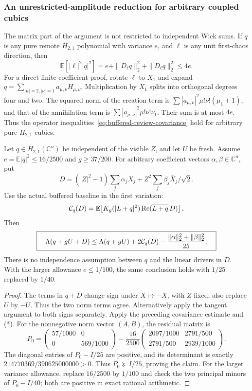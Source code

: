 \subsubsection{An unrestricted-amplitude reduction for arbitrary coupled cubics}
\label{sec:buffered-review-general}
The matrix part of the argument is not restricted to independent
Wick sums.  If \(q\) is any pure remote \(H_{2,1}\) polynomial
with variance \(e\), and \(\ell\) is any unit first-chaos direction,
then
\[
 \mathbb E[|\ell|^2|q|^2]
  =e+\|D_\ell q\|_2^2+\|\bar D_\ell q\|_2^2\le4e.
\]
For a direct finite-coefficient proof, rotate \(\ell\) to \(X_1\)
and expand \(q=\sum_{|\mu|=2,|\nu|=1}a_{\mu,\nu}H_{\mu,\nu}\).
Multiplication by \(X_1\) splits into orthogonal degrees four
and two. The squared norm of the creation term is
\(\sum |a_{\mu,\nu}|^2\mu!\nu!(\mu_1+1)\), and that of
the annihilation term is
\(\sum |a_{\mu,\nu}|^2\mu!\nu!\nu_1\).
Their sum is at most \(4e\). Thus
the operator inequalities~\eqref{eq:buffered-review-covariance}
hold for arbitrary pure \(H_{2,1}\) cubics.

\begin{proposition}
Let \(q\in H_{2,1}(\mathbb C^n)\) be independent of the visible \(Z\),
and let \(U\) be fresh. Assume \(e=\mathbb E|q|^2\le16/2500\)
and \(g\ge37/200\). For arbitrary coefficient vectors
\(\alpha,\beta\in\mathbb C^n\), put
\[
 D=(|Z|^2-1)\sum_j\alpha_jX_j+
       Z^2\sum_j\beta_j\bar X_j/\sqrt2 .
\]
Use the actual buffered baseline in the first variation:
\[
 {\cal C}_q(D)=\mathbb E\!\left[
   K_g(|L+q|^2)\operatorname{Re}(\overline{L+q}\,D)\right].
\]
Then
\[
 \boxed{\quad
 \Lambda(q+gU+D)\le
 \Lambda(q+gU)+2{\cal C}_q(D)
       -\frac{\|\alpha\|_2^2+\|\beta\|_2^2}{25}.
 \quad}
\]
There is no independence assumption between \(q\) and the linear
drivers in \(D\).
With the larger allowance \(e\le1/100\), the same conclusion holds
with \(1/25\) replaced by \(1/40\).
\end{proposition}
\begin{proof}
The terms in \(q+D\) change sign under \(X\mapsto-X\), with \(Z\)
fixed; also replace \(U\) by \(-U\). Thus the two norm terms agree.
Alternatively apply the tangent argument to both signs separately.
Apply the preceding covariance estimate and (*).
For the nonnegative norm vector \((A,B)\), the residual matrix is
\[
 P_0=
 \begin{pmatrix}57/1000&0\\0&569/1000\end{pmatrix}
 -\frac{16}{2500}
 \begin{pmatrix}2097/1000&2791/500\\2791/500&2939/1000\end{pmatrix}.
\]
The diagonal entries of \(P_0-I/25\) are positive, and its
determinant is exactly \(214770369/390625000000>0\).
Thus \(P_0\succeq I/25\), proving the claim.
For the larger variance allowance, replace \(16/2500\) by \(1/100\)
and check the two principal minors of \(P_0-I/40\); both are positive
in exact rational arithmetic.
\end{proof}
